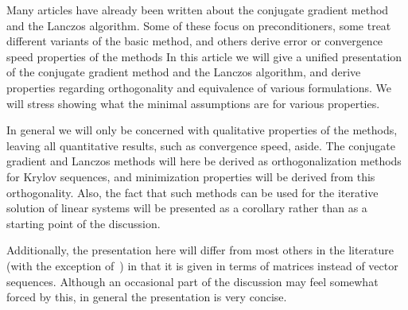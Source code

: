 Many articles have already been written about the conjugate gradient
method and the Lanczos algorithm.
Some of these focus on preconditioners, some treat different
variants of the basic method, and others derive error or
convergence speed properties of the methods
In this article  we will
give a unified presentation of the conjugate gradient method
and the Lanczos algorithm, and derive  properties regarding
orthogonality and equivalence of various formulations.
We will stress showing what the minimal assumptions are
for various properties. 

In general we will only be concerned with
qualitative properties of the methods, leaving all quantitative
results, such as convergence speed, aside.
The conjugate gradient and Lanczos methods
will here be derived as orthogonalization methods for Krylov
sequences, and minimization properties will be derived from this
orthogonality. Also, the fact that such methods can be used for
the iterative solution of linear systems will be presented as a
corollary rather than as a starting point of the discussion.

Additionally, the presentation here will differ from most others in
the literature (with the exception of~\cite{Householder:theory}) in that it is
given in terms of matrices instead of vector sequences. Although an
occasional part of the discussion may feel somewhat forced by this, in
general the presentation is very concise.

